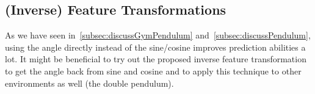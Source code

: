 	\subsection{(Inverse) Feature Transformations}
		As we have seen in~\autoref{subsec:discussGymPendulum} and~\ref{subsec:discussPendulum}, using the angle directly instead of the sine/cosine improves prediction abilities a lot. It might be beneficial to try out the proposed inverse feature transformation to get the angle back from sine and cosine and to apply this technique to other environments as well (\eg the double pendulum).
